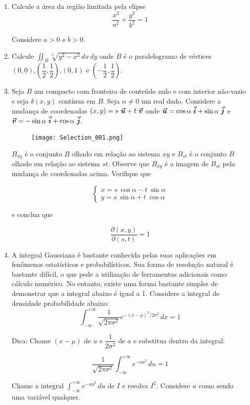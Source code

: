 \documentclass[11pt,a4paper]{article}
\newcommand{\integral}{\displaystyle\int}
\newcommand{\mat}[1]{\mbox{\boldmath{$#1$}}}
\begin{document}
\begin{enumerate}
		\item Calcule a área da região limitada pela elipse 
		$$\displaystyle\dfrac{x^2}{a^2} + \displaystyle\dfrac{y^2}{b^2} = 1$$
		
		Considere $a > 0$ e $b > 0$. 
		
		\item Calcule $\displaystyle\iint_B \sqrt[3]{y^2 - x^2} \,dx\,dy$ onde $B$ é o paralelogramo de vértices $(0,0) \textrm{,} \left(\displaystyle\dfrac{1}{2},\displaystyle\dfrac{1}{2}\right)\textrm{,} (0,1) \textrm{ e } \left(-\displaystyle\dfrac{1}{2},\displaystyle\dfrac{1}{2}\right)$.
		
		\item Seja $B$ um compacto com fronteira de conteúdo nulo e com interior não-vazio e seja $\delta (x,y)$ contínua em $B$. Seja $\alpha \neq 0$ um real dado. Considere a mudança de coordenadas $(x,y) = s \ \mat{\vec{u}} + t \ \mat{\vec{v}}$ onde $\mat{\vec{u}} = \cos \alpha \ \mat{\vec{i}} + \sin \alpha \ \mat{\vec{j}}$ e $\mat{\vec{v}} = -\sin \alpha \ \mat{\vec{i}} + \cos \alpha \ \mat{\vec{j}}$.
		
\begin{figure}[h]
\centering %
\texttt{[image: Selection\_001.png]} %
\end{figure}

$B_{xy}$ é o conjunto $B$ olhado em relação ao sistema $xy$ e $B_{st}$ é o conjunto $B$ olhado em relação ao sistema $st$. Observe que $B_{xy}$ é a imagem de $B_{st}$ pela mudança de coordenadas acima. Verifique que

	$$ 
		\begin{cases}
			x = s \ \cos \alpha - t \ \sin \alpha \\
			y = s \ \sin \alpha + t \ \cos \alpha
		\end{cases}
	$$
	
	e conclua que
	
	$$\dfrac{\partial (x,y) }{\partial (s,t)} = 1$$	
	
\item A integral Gaussiana é bastante conhecida pelas suas aplicações em fenômenos estatísticos e probabilísticos. Sua forma de resolução natural é bastante difícil, o que pede a utilização de ferramentas adicionais como cálculo numérico. No entanto, existe uma forma bastante simples de demonstrar que a integral abaixo é igual a 1. Considere a integral de densidade probabilidade abaixo:
	$$\integral_{-\infty}^{+\infty} \dfrac{1}{\sqrt{2 \pi \sigma^2}} e^{-(x - \mu)^2/2\sigma^2}  \, dx = 1$$
	
	Dica: Chame $(x - \mu)$ de $u$ e $\dfrac{1}{2\sigma^2}$ de $a$ e substitua dentro da integral:
	
	$$\dfrac{1}{\sqrt{2 \pi \sigma^2}} \integral_{-\infty}^{+\infty}  e^{-au^2}  \, du = 1$$
	
	Chame a integral $ \integral_{-\infty}^{+\infty}  e^{-au^2}  \, du $ de $I$ e resolva $I^2$. Considere $u$ como sendo uma variável qualquer.
	 	
	
	\end{enumerate}	
	
	
	
\end{document}
